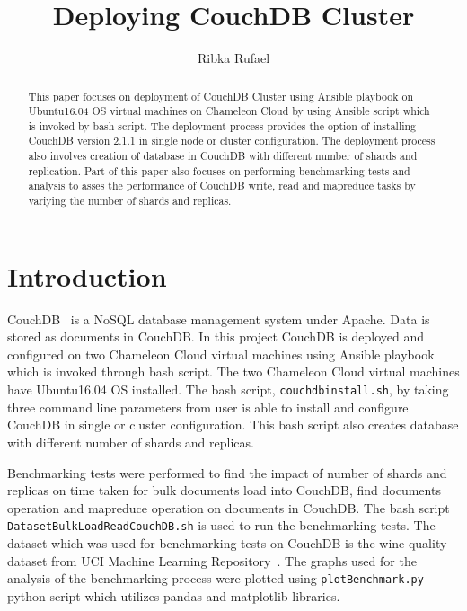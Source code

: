 
\title{Deploying CouchDB Cluster}


\author{Ribka Rufael}
\orcid{}



\renewcommand{\shortauthors}{R. Rufael}


\begin{abstract}
  This paper focuses on deployment of CouchDB Cluster using Ansible
  playbook on Ubuntu16.04 OS virtual machines on Chameleon Cloud by
  using Ansible script which is invoked by bash script. The deployment
  process provides the option of installing CouchDB version 2.1.1 in
  single node or cluster configuration. The deployment process also
  involves creation of database in CouchDB with different number of
  shards and replication. Part of this paper also focuses on
  performing benchmarking tests and analysis to asses the performance
  of CouchDB write, read and mapreduce tasks by variying the number of
  shards and replicas.
\end{abstract}



\maketitle

\section{Introduction}

CouchDB~\cite{www-Couchdb} is a NoSQL database management system
under Apache. Data is stored as documents in CouchDB. In this project
CouchDB is deployed and configured on two Chameleon Cloud virtual machines using
Ansible playbook which is invoked through bash script. The two Chameleon
Cloud virtual machines have Ubuntu16.04 OS installed. The bash script, 
\verb|couchdbinstall.sh|, by taking three command line parameters from user is
able to install and configure CouchDB in single or cluster
configuration.  This bash script also creates database with different
number of shards and replicas. 

Benchmarking tests were performed to find the
impact of number of shards and replicas on time taken for bulk
documents load into CouchDB, find documents operation and mapreduce
operation on documents in CouchDB. The bash script \verb|DatasetBulkLoadReadCouchDB.sh| is used to run the
benchmarking tests.  The dataset which
was used for benchmarking tests on CouchDB is the wine quality dataset
from UCI Machine Learning Repository~\cite{www-WineQuality}. The
graphs used for the analysis of the benchmarking process were plotted
using \verb|plotBenchmark.py| python script which utilizes pandas and
matplotlib libraries.

